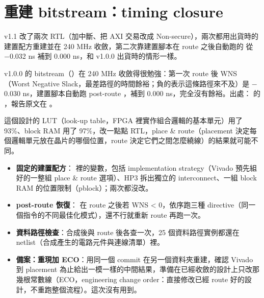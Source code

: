\section{重建 bitstream：timing closure}
\label{sec:timing}

\begin{oneline}
v1.1 改了兩次 RTL（加中斷、把 AXI 交易改成 Non-secure），兩次都用出貨時的建置配方重建並在 240 MHz 收斂，第二次靠建置腳本在 route 之後自動跑的  從 $-$0.032 ns 補到 0.000 ns，和 v1.0.0 出貨時的情形一樣。
\end{oneline}

\begin{before}
v1.0.0 的 bitstream（）在 240 MHz 收斂得很勉強：第一次 route 後 WNS（Worst Negative Slack，最差路徑的時間餘裕；負的表示這條路徑來不及）是 $-$0.030 ns，建置腳本自動跑 post-route ，補到 0.000 ns，完全沒有餘裕。出處： 的 ，報告原文在 。

這個設計的 LUT（look-up table，FPGA 裡實作組合邏輯的基本單元）用了 93\%、block RAM 用了 97\%，改一點點 RTL，place \& route（placement 決定每個邏輯單元放在晶片的哪個位置，route 決定它們之間怎麼繞線）的結果就可能不同。
\end{before}

\begin{tech}
\begin{itemize}
\item \textbf{固定的建置配方}： 裡的變數，包括 implementation strategy（Vivado 預先組好的一整組 place \& route 選項）、HP3 拆出獨立的 interconnect、一組 block RAM 的位置限制（pblock）；兩次都沒改。
\item \textbf{post-route 恢復}： 在 route 之後若 WNS < 0，依序跑三種  directive（同一個指令的不同最佳化模式），還不行就重新 route 再跑一次。
\item \textbf{資料路徑檢查}：合成後與 route 後各查一次，25 個資料路徑實例都還在 netlist（合成產生的電路元件與連線清單）裡。
\item \textbf{備案：重現加 ECO}：用同一個 commit 在另一個資料夾重建，確認 Vivado 到 placement 為止給出一模一樣的中間結果，準備在已經收斂的設計上只改那幾根常數線（ECO，engineering change order：直接修改已經 route 好的設計，不重跑整個流程）。這次沒有用到。
\end{itemize}
\end{tech}

